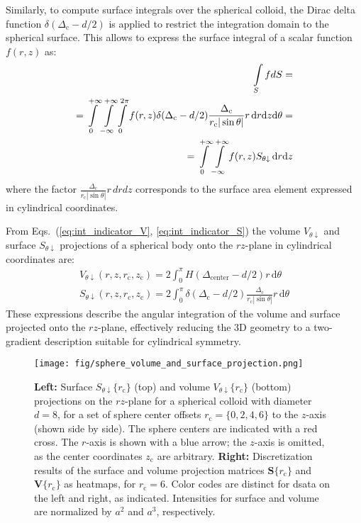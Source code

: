 \documentclass[10pt, a4paper, twocolumn]{article}
\begin{document}
Similarly, to compute surface integrals over the spherical colloid, the Dirac delta function $\delta(\Delta_{\text{c}} - d/2)$ is applied to restrict the integration domain to the spherical surface.
This allows to express the surface integral of a scalar function $f(r,z)$ as:
\begin{eqnarray}
    \label{eq:int_indicator_S}
    \begin{aligned}
        \int\limits_{S} f dS = \\
        = \int\displaylimits_{0}^{+\infty} \int\displaylimits_{-\infty}^{+\infty} \int\displaylimits_{0}^{2\pi} f(r, z) \delta(\Delta_{\text{c}} - d/2)  \frac{\Delta_{\text{c}}}{r_{\text{c}} |\sin\theta|} r \, \text{d}r \text{d}z \text{d}\theta=\\
        =\int\displaylimits_{0}^{+\infty} \int\displaylimits_{-\infty}^{+\infty} f(r, z)  S_{\theta \downarrow} \, \text{d}r \text{d}z
    \end{aligned}
\end{eqnarray}
where the factor $\frac{\Delta_{\text{c}}}{r_{\text{c}} |\sin\theta|}r \, dr dz$ corresponds to the surface area element expressed in cylindrical coordinates.

From Eqs.~(\ref{eq:int_indicator_V}, \ref{eq:int_indicator_S}) the volume $V_{\theta \downarrow}$ and surface $S_{\theta \downarrow}$ projections of a spherical body onto the $rz$-plane in cylindrical coordinates are:
\begin{gather}
    V_{\theta \downarrow}(r, z, r_{\text{c}}, z_{\text{c}}) = 2\int_{0}^{\pi} H\!\left( \Delta_{\text{center}} - {d}/{2} \right) r \, \text{d}\theta
    \\
    S_{\theta \downarrow}(r, z, r_{\text{c}}, z_{\text{c}}) = 2\int_{0}^{\pi}\delta(\Delta_{\text{c}} - d/2)  \frac{\Delta_{\text{c}}}{r_{\text{c}} |\sin\theta|} r \, \text{d}\theta
\end{gather}
These expressions describe the angular integration of the volume and surface projected onto the $rz$-plane, effectively reducing the 3D geometry to a two-gradient description suitable for cylindrical symmetry.

\begin{figure}[]
    \centering
    \texttt{[image: fig/sphere\_volume\_and\_surface\_projection.png]}
    \caption{
        \textbf{Left:}
        Surface $S_{\theta \downarrow}\{r_{\text{c}}\}$ (top) and volume $V_{\theta \downarrow}\{r_{\text{c}}\}$ (bottom) projections on the $rz$-plane for a spherical colloid with diameter $d = 8$, for a set of sphere center offsets $r_{\text{c}} = \{0, 2, 4, 6\}$ to the $z$-axis (shown side by side).
        The sphere centers are indicated with a red cross.
        The $r$-axis is shown with a blue arrow; the $z$-axis is omitted, as the center coordinates $z_{\text{c}}$ are arbitrary.
        \textbf{Right:}
        Discretization results of the surface and volume projection matrices $\bm{S}\{r_{\text{c}}\}$ and $\bm{V}\{r_{\text{c}}\}$ as heatmaps, for $r_{\text{c}} = 6$.
        Color codes are distinct for dsata on the left and right, as indicated.
        Intensities for surface and volume are normalized by $a^2$ and $a^3$, respectively.
    }
    \label{fig:sphere_volume_and_surface_projection}
\end{figure}
\end{document}

